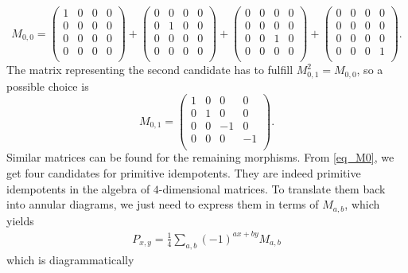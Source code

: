 	\begin{equation}
	\label{eq_M0}
		M_{0,0}=
		\begin{pmatrix}
		1 & 0 & 0 & 0\\
		0 & 0 & 0 & 0\\
		0 & 0 & 0 & 0\\
		0 & 0 & 0 & 0\\
		\end{pmatrix}
		+\begin{pmatrix}
		0 & 0 & 0 & 0\\
		0 & 1 & 0 & 0\\
		0 & 0 & 0 & 0\\
		0 & 0 & 0 & 0\\
		\end{pmatrix}
		+
		\begin{pmatrix}
		0 & 0 & 0 & 0\\
		0 & 0 & 0 & 0\\
		0 & 0 & 1 & 0\\
		0 & 0 & 0 & 0\\
		\end{pmatrix}
		+\begin{pmatrix}
		0 & 0 & 0 & 0\\
		0 & 0 & 0 & 0\\
		0 & 0 & 0 & 0\\
		0 & 0 & 0 & 1\\
		\end{pmatrix}
		.
	\end{equation}
The matrix representing the second candidate has to fulfill $M_{0,1}^2=M_{0,0}$, so a possible choice is
	\begin{equation}
		M_{0,1}=\begin{pmatrix}
			1 & 0 & 0 & 0\\
			0 & 1 & 0 & 0\\
			0 & 0 & -1 & 0\\
			0 & 0 & 0 & -1\\
		\end{pmatrix}.
	\end{equation}
	Similar matrices can be found for the remaining morphisms.
From \eqref{eq_M0}, we get four candidates for primitive idempotents. They are indeed primitive idempotents in the algebra of $4$-dimensional matrices. To translate them back into annular diagrams, we just need to express them in terms of $M_{a,b}$, which yields
	\begin{align}
	P_{x,y}=\frac{1}{4}\sum_{a,b}(-1)^{ax+by}M_{a,b}
	\end{align}
which is diagrammatically
